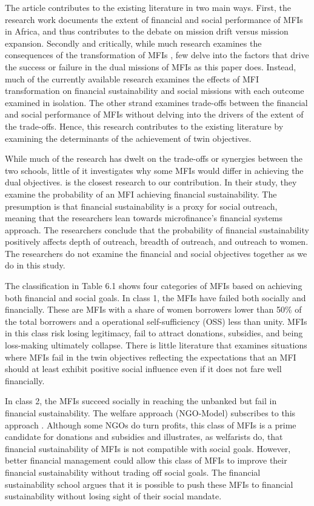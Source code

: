 \documentclass[a4paper, nobind]{templates/ociamthesis}
\begin{document}
The article contributes to the existing literature in two main ways. First, the research work documents the extent of financial and social performance of MFIs in Africa, and thus contributes to the debate on mission drift versus mission expansion. Secondly and critically, while much research examines the consequences of the transformation of MFIs \autocite{fernando2004micro,hishigsuren2006transformation,d2017ngos,ramus2017}, few delve into the factors that drive the success or failure in the dual missions of MFIs as this paper does. Instead, much of the currently available research examines the effects of MFI transformation on financial sustainability and social missions with each outcome examined in isolation. The other strand examines trade-offs between the financial and social performance of MFIs without delving into the drivers of the extent of the trade-offs. Hence, this research contributes to the existing literature by examining the determinants of the achievement of twin objectives.

While much of the research has dwelt on the trade-offs or synergies between the two schools, little of it investigates why some MFIs would differ in achieving the dual objectives. \textcite{quayes2019probability} is the closest research to our contribution. In their study, they examine the probability of an MFI achieving financial sustainability. The presumption is that financial sustainability is a proxy for social outreach, meaning that the researchers lean towards microfinance's financial systems approach. The researchers conclude that the probability of financial sustainability positively affects depth of outreach, breadth of outreach, and outreach to women. The researchers do not examine the financial and social objectives together as we do in this study.

The classification in Table 6.1 shows four categories of MFIs based on achieving both financial and social goals. In class 1, the MFIs have failed both socially and financially. These are MFIs with a share of women borrowers lower than 50\% of the total borrowers and a operational self-sufficiency (OSS) less than unity. MFIs in this class risk losing legitimacy, fail to attract donations, subsidies, and being loss-making ultimately collapse. There is little literature that examines situations where MFIs fail in the twin objectives reflecting the expectations that an MFI should at least exhibit positive social influence even if it does not fare well financially.

In class 2, the MFIs succeed socially in reaching the unbanked but fail in financial sustainability. The welfare approach (NGO-Model) subscribes to this approach \autocite{kodongo2013individual}. Although some NGOs do turn profits, this class of MFIs is a prime candidate for donations and subsidies and illustrates, as welfarists do, that financial sustainability of MFIs is not compatible with social goals. However, better financial management could allow this class of MFIs to improve their financial sustainability without trading off social goals. The financial sustainability school argues that it is possible to push these MFIs to financial sustainability without losing sight of their social mandate.
\end{document}
